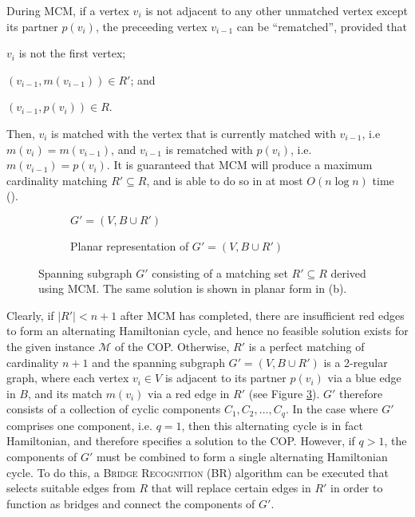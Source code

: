 \documentclass[oribibl]{llncs}
\begin{document}
During MCM, if a vertex $v_i$ is not adjacent to any other unmatched vertex except its partner $p(v_i)$, the preceeding vertex $v_{i-1}$ can be ``rematched'', provided that 
\begin{enumerate*}[label={(\alph*)}]
	\item $v_i$ is not the first vertex; 
	\item $(v_{i-1}, m(v_{i-1})) \in R'$; and
	\item $(v_{i-1}, p(v_i)) \in R$.
\end{enumerate*}
Then, $v_i$ is matched with the vertex that is currently matched with $v_{i-1}$, i.e $m(v_i) = m(v_{i-1})$, and $v_{i-1}$ is rematched with $p(v_i)$, i.e. $m(v_{i-1}) = p(v_i)$. It is guaranteed that MCM will produce a maximum cardinality matching $R' \subseteq R$, and is able to do so in at most $O(n \log n)$ time (\citealp{mahadev1994}).

\begin{figure}	
	\centering
	\begin{subfigure}[h]{0.4\textwidth}
		
		\caption{$G' = (V, B \cup R')$}	
		\label{fig:matching}
	\end{subfigure} \quad
	\begin{subfigure}[h]{0.5\textwidth}
		
		\caption{Planar representation of $G' =(V, B \cup R')$}	
		\label{fig:mps}
	\end{subfigure}
	\caption{Spanning subgraph $G'$ consisting of a matching set $R' \subseteq R$ derived using MCM. The same solution is shown in planar form in (b).}
	\label{fig:matching/mps}
\end{figure}

Clearly, if $|R'| < n+1$ after MCM has completed, there are insufficient red edges to form an alternating Hamiltonian cycle, and hence no feasible solution exists for the given instance $\mathcal{M}$ of the COP. Otherwise, $R'$ is a perfect matching of cardinality $n+1$ and the spanning subgraph $G'=(V, B \cup R')$ is a 2-regular graph, where each vertex $v_i \in V$ is adjacent to its partner $p(v_i)$ via a blue edge in $B$, and its match $m(v_i)$ via a red edge in $R'$ (see Figure \ref{fig:matching/mps}). $G'$ therefore consists of a collection of cyclic components $C_1, C_2, ..., C_q$. In the case where $G'$ comprises one component, i.e. $q = 1$, then this alternating cycle is in fact Hamiltonian, and therefore specifies a solution to the COP. However, if $q > 1$, the components of $G'$ must be combined to form a single alternating Hamiltonian cycle. To do this, a \textsc{Bridge Recognition} (BR) algorithm can be executed that selects suitable edges from $R$ that will replace certain edges in $R'$ in order to function as bridges and connect the components of $G'$.
\end{document}
